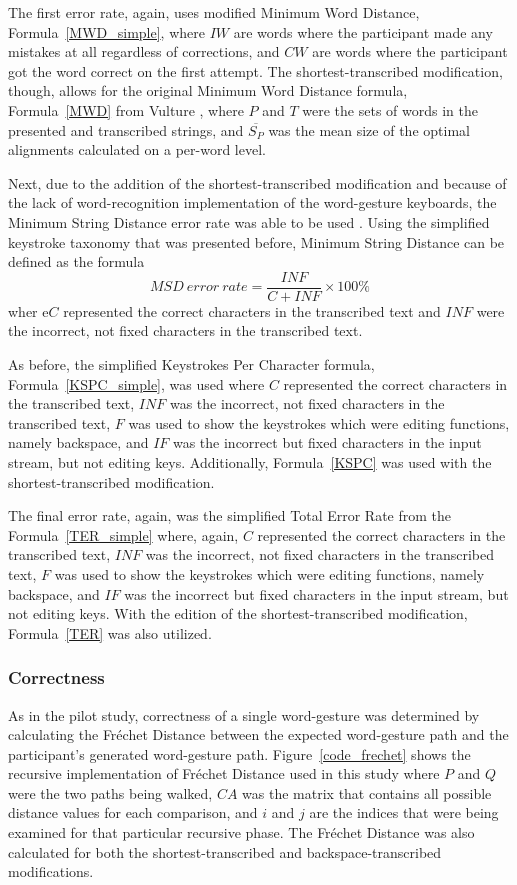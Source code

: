 The first error rate, again, uses modified Minimum Word Distance, Formula~\ref{MWD_simple}, where $IW$ are words where the participant made any mistakes at all regardless of corrections, and $CW$ are words where the participant got the word correct on the first attempt. The shortest-transcribed modification, though, allows for the original Minimum Word Distance formula, Formula~\ref{MWD} from Vulture \cite{ref_vulture}, where $P$ and $T$ were the sets of words in the presented and transcribed strings, and $\overline{S_P}$ was the mean size of the optimal alignments calculated on a per-word level.

Next, due to the addition of the shortest-transcribed modification and because of the lack of word-recognition implementation of the word-gesture keyboards, the Minimum String Distance error rate was able to be used \cite{ref_error_rates}. Using the simplified keystroke taxonomy that was presented before, Minimum String Distance can be defined as the formula
\begin{equation} \label{pilot_ter}
	MSD\ error\ rate = \frac{INF}{C + INF} \times 100\%
\end{equation}
wher e$C$ represented the correct characters in the transcribed text and $INF$ were the incorrect, not fixed characters in the transcribed text.

As before, the simplified Keystrokes Per Character formula, Formula~\ref{KSPC_simple}, was used where $C$ represented the correct characters in the transcribed text, $INF$ was the incorrect, not fixed characters in the transcribed text, $F$ was used to show the keystrokes which were editing functions, namely backspace, and $IF$ was the incorrect but fixed characters in the input stream, but not editing keys. Additionally, Formula~\ref{KSPC} was used with the shortest-transcribed modification.

The final error rate, again, was the simplified Total Error Rate from the Formula~\ref{TER_simple} where, again, $C$ represented the correct characters in the transcribed text, $INF$ was the incorrect, not fixed characters in the transcribed text, $F$ was used to show the keystrokes which were editing functions, namely backspace, and $IF$ was the incorrect but fixed characters in the input stream, but not editing keys. With the edition of the shortest-transcribed modification, Formula~\ref{TER} was also utilized.

\subsubsection{Correctness}
As in the pilot study, correctness of a single word-gesture was determined by calculating the Fr\'echet Distance between the expected word-gesture path and the participant's generated word-gesture path. Figure~\ref{code_frechet} shows the recursive implementation of Fr\'echet Distance used in this study where $P$ and $Q$ were the two paths being walked, $CA$ was the matrix that contains all possible distance values for each comparison, and $i$ and $j$ are the indices that were being examined for that particular recursive phase. The Fr\'echet Distance was also calculated for both the shortest-transcribed and backspace-transcribed modifications.

